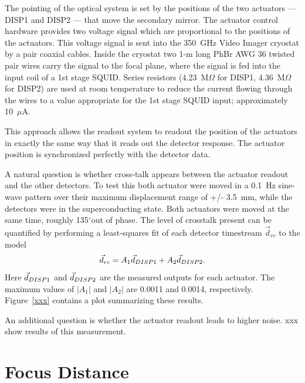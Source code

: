 \documentclass[10pt,twocolumn,article]{memoir}
\newcommand*{\figref}[1]{Figure~\ref{#1}}
\newcommand*{\SQUID}{{\small SQUID}\xspace}
\newcommand*{\AWG}{{\small AWG}\xspace}
\newcommand*{\uA}{\ensuremath{\mu}A\xspace}
\newcommand*{\Ohm}{\ensuremath{\Omega}\xspace}
\newcommand*{\Imager}{350~GHz Video Imager\xspace}
\newcommand*{\vect}[1]{\vec{#1}}
\newcommand*{\textdegree}{\ensuremath{^{\circ}}}
\newcommand*{\DISP}[1]{{\small DISP{#1}}\xspace}
\begin{document}
The pointing of the optical system is set by the positions of the two actuators --- \DISP1 and \DISP2 --- that move the secondary mirror.
The actuator control hardware provides two voltage signal which are proportional to the positions of the actuators.
This voltage signal is sent into the \Imager cryostat by a pair coaxial cables.
Inside the cryostat two 1-m long PhBr \AWG36 twisted pair wires carry the signal to the focal plane, where the signal is fed into the input coil of a 1st stage \SQUID.
Series resistors (4.23~M\Ohm for \DISP1, 4.36~M\Ohm for \DISP2) are used at room temperature to reduce the current flowing through the wires to a value appropriate for the 1st stage \SQUID input; approximately 10~\uA.

This approach allows the readout system to readout the position of the actuators in exactly the same way that it reads out the detector response.
The actuator position is synchronized perfectly with the detector data.

A natural question is whether cross-talk appears between the actuator readout and the other detectors.
To test this both actuator were moved in a 0.1~Hz sine-wave pattern over their maximum displacement range of +/- 3.5~mm, while the detectors were in the superconducting state.
Both actuators were moved at the same time, roughly 135\textdegree out of phase.
The level of crosstalk present can be quantified by performing a least-squares fit of each detector timestream $\vect{d}_{rc}$ to the model
\[
	 \vect{d}_{rc} = A_1 \vect{d}_{\DISP1} + A_2 \vect{d}_{\DISP2}.
\]
Here $\vect{d}_{\DISP1}$ and $\vect{d}_{\DISP2}$ are the measured outputs for each actuator.
The maximum values of $|A_1|$  and $|A_2|$ are 0.0011 and 0.0014, respectively.
\figref{xxx} contains a plot summarizing these results.

An additional question is whether the actuator readout leads to higher noise.
xxx show results of this measurement.


\section{Focus Distance}\label{s:focus-distance}
\end{document}
